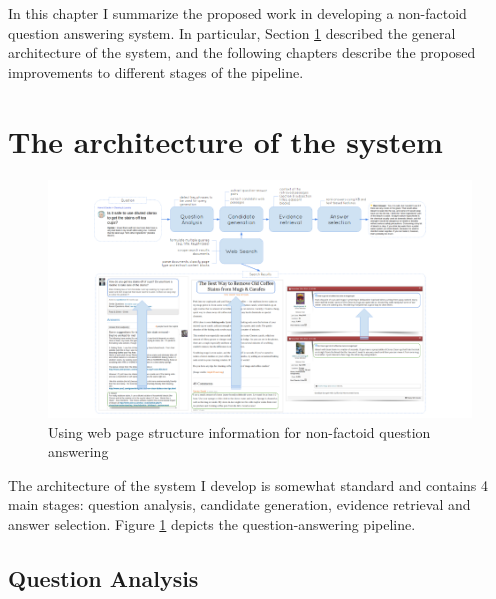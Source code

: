 %

\label{chapter:non-factoid}

\noindent

In this chapter I summarize the proposed work in developing a non-factoid question answering system.
In particular, Section \ref{sec:non-factoid:architecture} described the general architecture of the system, and the following chapters describe the proposed improvements to different stages of the pipeline.

\section{The architecture of the system}
\label{sec:non-factoid:architecture}

\begin{figure}[h]
\centering
\includegraphics[width=\textwidth]{img/web_page_structure_nonfactoid}
\caption{Using web page structure information for non-factoid question answering}
\label{fig:non-factoid:architecture}
\end{figure}

The architecture of the system I develop is somewhat standard and contains 4 main stages: question analysis, candidate generation, evidence retrieval and answer selection.
Figure \ref{fig:non-factoid:architecture} depicts the question-answering pipeline.

\subsection{Question Analysis}
\label{sec:non-factoid:architecture:analysis}

